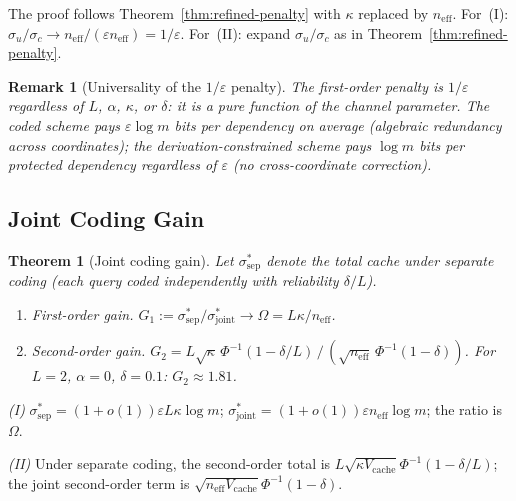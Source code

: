 \documentclass[journal]{IEEEtran}
\makeatletter
\newtheorem{theorem}{Theorem}[section]
\newtheorem{remark}{Remark}[section]
\numberwithin{equation}{section}
\renewenvironment{proof}[1][\proofname]{\par
  \pushQED{\qed}%
  \normalfont \topsep6\p@\@plus6\p@\relax
  \trivlist
  \item[\hskip\labelsep
        \itshape
    #1\@addpunct{.}]\ignorespaces
}{%
  \popQED\endtrivlist\@endpefalse
}
\makeatother
\begin{document}
\begin{proof}
The proof follows Theorem~\ref{thm:refined-penalty} with
$\kappa$ replaced by $n_{\mathrm{eff}}$.
For~(I): $\sigma_u/\sigma_c
\to n_{\mathrm{eff}}/(\varepsilon n_{\mathrm{eff}})
=1/\varepsilon$.
For~(II): expand $\sigma_u/\sigma_c$ as in
Theorem~\ref{thm:refined-penalty}.
\end{proof}

\begin{remark}[Universality of the $1/\varepsilon$ penalty]
\label{rem:universality}
The first-order penalty is $1/\varepsilon$ regardless of $L$,
$\alpha$, $\kappa$, or $\delta$: it is a pure function of the
channel parameter.
The coded scheme pays
$\varepsilon\log m$ bits per dependency on average (algebraic
redundancy across coordinates); the
derivation-constrained scheme pays $\log m$ bits per protected
dependency regardless of $\varepsilon$ (no cross-coordinate
correction).
\end{remark}

\subsection{Joint Coding Gain}
\label{subsec:mq-gain}

\begin{theorem}[Joint coding gain]
\label{thm:joint-gain-mq}
Let $\sigma^*_{\mathrm{sep}}$ denote the total cache under
separate coding \textup{(}each query coded independently
with reliability $\delta/L$\textup{)}.
\begin{enumerate}[label=\textup{(\Roman*)}]
\item \emph{First-order gain.}\;
$G_1:=\sigma^*_{\mathrm{sep}}/\sigma^*_{\mathrm{joint}}
\to\Omega=L\kappa/n_{\mathrm{eff}}$.

\item \emph{Second-order gain.}\;
$G_2
=L\sqrt\kappa\,\Phi^{-1}(1{-}\delta/L)\,/\,
(\sqrt{n_{\mathrm{eff}}}\,\Phi^{-1}(1{-}\delta))$.
For $L=2$, $\alpha=0$, $\delta=0.1$:
$G_2\approx 1.81$.
\end{enumerate}
\end{theorem}

\begin{proof}
\emph{(I)}\;
$\sigma^*_{\mathrm{sep}}
=(1{+}o(1))\varepsilon L\kappa\log m$;
$\sigma^*_{\mathrm{joint}}
=(1{+}o(1))\varepsilon n_{\mathrm{eff}}\log m$;
the ratio is $\Omega$.

\emph{(II)}\;
Under separate coding, the second-order total is
$L\sqrt{\kappa V_{\mathrm{cache}}}
\Phi^{-1}(1{-}\delta/L)$;
the joint second-order term is
$\sqrt{n_{\mathrm{eff}}V_{\mathrm{cache}}}
\Phi^{-1}(1{-}\delta)$.
\end{proof}
\end{document}
